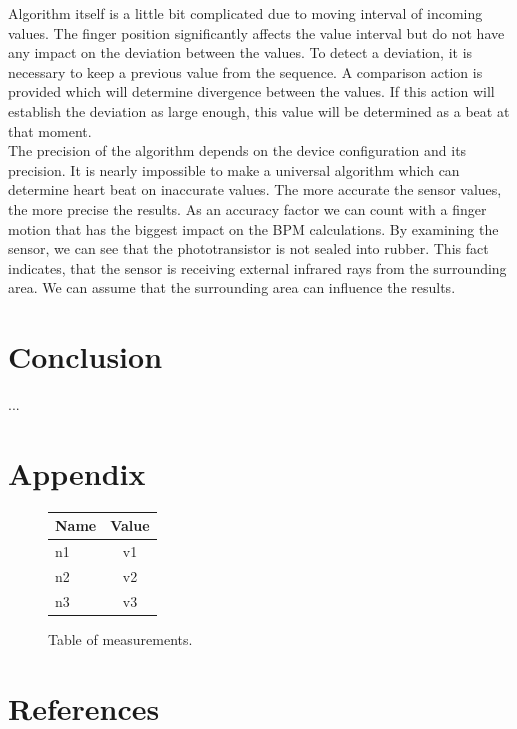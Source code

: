 \documentclass[11pt,a4paper]{article}
\begin{document}
Algorithm itself is a little bit complicated due to moving interval of incoming values. The finger position significantly affects the value interval but do not have any impact on the deviation between the values. To detect a deviation, it is necessary to keep a previous value from the sequence. A comparison action is provided which will determine divergence between the values. If this action will establish the deviation as large enough, this value will be determined as a beat at that moment.\\

The precision of the algorithm depends on the device configuration and its precision. It is nearly impossible to make a universal algorithm which can determine heart beat on inaccurate values. The more accurate the sensor values, the more precise the results. As an accuracy factor we can count with a finger motion that has the biggest impact on the BPM calculations. By examining the sensor, we can see that the phototransistor is not sealed into rubber. This fact indicates, that the sensor is receiving external infrared rays from the surrounding area. We can assume that the surrounding area can influence the results.

\section{Conclusion}
...

\newpage %

\section{Appendix}

\begin{figure}[H]
    \begin{center}
        \begin{tabular}{|l|c|}
            \hline
            \textbf{Name} & \textbf{Value} \\
            \hline\hline
            n1 & v1 \\\hline
            n2 & v2 \\\hline
            n3 & v3 \\\hline
        \end{tabular}
    \end{center}
    \caption{Table of measurements.}
    \label{fig:measurements}
\end{figure}

\newpage %

\section{References}

\begin{flushleft}
    
\end{flushleft}


\end{document}
